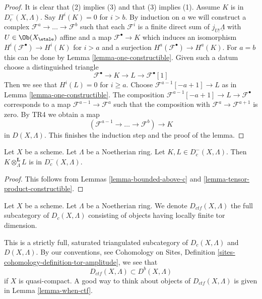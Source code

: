 \begin{proof}
It is clear that (2) implies (3) and that (3) implies (1).
Assume $K$ is in $D_c^-(X, \Lambda)$.
Say $H^i(K) = 0$ for $i > b$. By induction on $a$
we will construct a complex $\mathcal{F}^a \to \ldots \to \mathcal{F}^b$
such that each $\mathcal{F}^i$ is a finite direct sum
of $j_{U!}\underline{\Lambda}$ with $U \in \Ob(X_\etale)$ affine
and a map $\mathcal{F}^\bullet \to K$ which induces an isomorphism
$H^i(\mathcal{F}^\bullet) \to H^i(K)$ for $i > a$ and a surjection
$H^a(\mathcal{F}^\bullet) \to H^a(K)$.
For $a = b$ this can be done by Lemma \ref{lemma-one-constructible}.
Given such a datum choose a distinguished triangle
$$
\mathcal{F}^\bullet \to K \to L \to \mathcal{F}^\bullet[1]
$$
Then we see that $H^i(L) = 0$ for $i \geq a$. Choose
$\mathcal{F}^{a - 1}[-a +1] \to L$ as in
Lemma \ref{lemma-one-constructible}. The composition
$\mathcal{F}^{a - 1}[-a +1] \to L \to \mathcal{F}^\bullet$
corresponds to a map $\mathcal{F}^{a - 1} \to \mathcal{F}^a$
such that the composition with $\mathcal{F}^a \to \mathcal{F}^{a + 1}$
is zero. By TR4 we obtain a map
$$
(\mathcal{F}^{a - 1} \to \ldots \to \mathcal{F}^b) \to K
$$
in $D(X, \Lambda)$. This finishes the induction step and the
proof of the lemma.
\end{proof}

\begin{lemma}
\label{lemma-tensor-c}
Let $X$ be a scheme. Let $\Lambda$ be a Noetherian ring.
Let $K, L \in D_c^-(X, \Lambda)$. Then
$K \otimes_\Lambda^\mathbf{L} L$ is in $D_c^-(X, \Lambda)$.
\end{lemma}

\begin{proof}
This follows from Lemmas \ref{lemma-bounded-above-c} and
\ref{lemma-tensor-product-constructible}.
\end{proof}

\begin{definition}
\label{definition-ctf}
Let $X$ be a scheme. Let $\Lambda$ be a Noetherian ring. We denote
{\it $D_{ctf}(X, \Lambda)$} the full subcategory of $D_c(X, \Lambda)$
consisting of objects having locally finite tor dimension.
\end{definition}

\noindent
This is a strictly full, saturated triangulated subcategory of
$D_c(X, \Lambda)$ and $D(X, \Lambda)$. By our conventions, see
Cohomology on Sites, Definition \ref{sites-cohomology-definition-tor-amplitude},
we see that
$$
D_{ctf}(X, \Lambda) \subset D^b(X, \Lambda)
$$
if $X$ is quasi-compact. A good way to think about objects of
$D_{ctf}(X, \Lambda)$ is given in Lemma \ref{lemma-when-ctf}.

